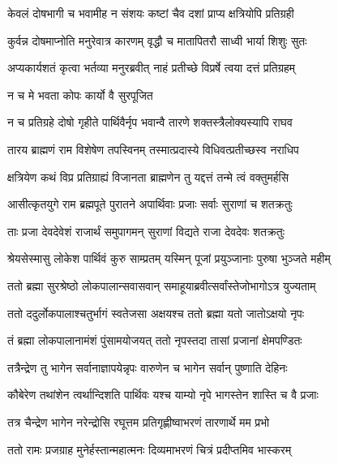 \twolineshloka
{केवलं दोषभागी च भवामीह न संशयः}
{कष्टां चैव दशां प्राप्य क्षत्रियोपि प्रतिग्रही}%

\twolineshloka
{कुर्वन्न दोषमाप्नोति मनुरेवात्र कारणम्}
{वृद्धौ च मातापितरौ साध्वी भार्या शिशुः सुतः}%

\twolineshloka
{अप्यकार्यशतं कृत्वा भर्तव्या मनुरब्रवीत्}
{नाहं प्रतीच्छे विप्रर्षे त्वया दत्तं प्रतिग्रहम्}%

\onelineshloka
{न च मे भवता कोपः कार्यो वै सुरपूजित}%


\twolineshloka
{न च प्रतिग्रहे दोषो गृहीते पार्थिवैर्नृप}
{भवान्वै तारणे शक्तस्त्रैलोक्यस्यापि राघव}%

\twolineshloka
{तारय ब्राह्मणं राम विशेषेण तपस्विनम्}
{तस्मात्प्रदास्ये विधिवत्प्रतीच्छस्व नराधिप}%


\twolineshloka
{क्षत्रियेण कथं विप्र प्रतिग्राह्यं विजानता}
{ब्राह्मणेन तु यद्दत्तं तन्मे त्वं वक्तुमर्हसि}%


\twolineshloka
{आसीत्कृतयुगे राम ब्रह्मपूते पुरातने}
{अपार्थिवाः प्रजाः सर्वाः सुराणां च शतक्रतुः}%

\twolineshloka
{ताः प्रजा देवदेवेशं राजार्थं समुपागमन्}
{सुराणां विद्यते राजा देवदेवः शतक्रतुः}%

\twolineshloka
{श्रेयसेस्मासु लोकेश पार्थिवं कुरु साम्प्रतम्}
{यस्मिन् पूजां प्रयुञ्जानाः पुरुषा भुञ्जते महीम्}%

\twolineshloka
{ततो ब्रह्मा सुरश्रेष्ठो लोकपालान्सवासवान्}
{समाहूयाब्रवीत्सर्वांस्तेजोभागोऽत्र युज्यताम्}%

\twolineshloka
{ततो ददुर्लोकपालाश्चतुर्भागं स्वतेजसा}
{अक्षयश्च ततो ब्रह्मा यतो जातोऽक्षयो नृपः}%

\twolineshloka
{तं ब्रह्मा लोकपालानामंशं पुंसामयोजयत्}
{ततो नृपस्तदा तासां प्रजानां क्षेमपण्डितः}%

\twolineshloka
{तत्रैन्द्रेण तु भागेन सर्वानाज्ञापयेन्नृपः}
{वारुणेन च भागेन सर्वान् पुष्णाति देहिनः}%

\twolineshloka
{कौबेरेण तथांशेन त्वर्थान्दिशति पार्थिवः}
{यश्च याम्यो नृपे भागस्तेन शास्ति च वै प्रजाः}%

\twolineshloka
{तत्र चैन्द्रेण भागेन नरेन्द्रोसि रघूत्तम}
{प्रतिगृह्णीष्वाभरणं तारणार्थे मम प्रभो}%

\twolineshloka
{ततो रामः प्रजग्राह मुनेर्हस्तान्महात्मनः}
{दिव्यमाभरणं चित्रं प्रदीप्तमिव भास्करम्}%

